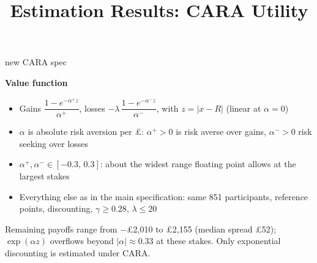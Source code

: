 \documentclass[aspectratio=169,11pt]{beamer}
\title{Estimation Results: CARA Utility}
\date{}
\newcommand{\ap}{\alpha^{+}}
\newcommand{\am}{\alpha^{-}}
\newcommand{\tabnote}[1]{\par\vfill{\scriptsize\color{muted}#1\par}}
\newcommand{\tight}{\setlength{\itemsep}{3pt}}
\begin{document}
\begin{frame}
  \titlepage
\end{frame}

\begin{frame}{new CARA spec}


\textbf{Value function}
\begin{itemize}\small\tight
  \item Gains $\dfrac{1-e^{-\ap z}}{\ap}$, losses $-\lambda\,\dfrac{1-e^{-\am z}}{\am}$, with $z=|x-R|$ (linear at $\alpha=0$)
  \item $\alpha$ is absolute risk aversion per \pounds: $\ap>0$ is risk averse over gains, $\am>0$ risk seeking over losses
  \item $\ap,\am\in[-0.3,\,0.3]$: about the widest range floating point allows at the largest stakes
  \item Everything else as in the main specification: same 851 participants, reference points, discounting, $\gamma\ge 0.28$, $\lambda\le 20$
\end{itemize}


\tabnote{Remaining payoffs range from $-$\pounds 2{,}010 to \pounds 2{,}155 (median spread \pounds 52); $\exp(\alpha z)$ overflows beyond $|\alpha|\approx 0.33$ at these stakes. Only exponential discounting is estimated under CARA.}
\end{frame}
\end{document}
